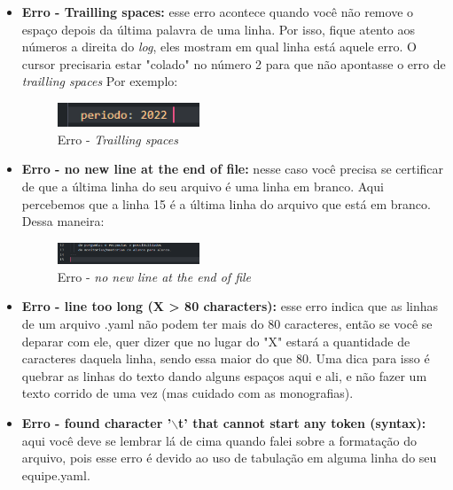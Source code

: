 \begin{itemize}
    \item \textbf{Erro - Trailling spaces:} esse erro acontece quando você não remove o espaço depois da última palavra de uma linha. Por isso, fique atento aos números a direita do \textit{log}, eles mostram em qual linha está aquele erro. O cursor precisaria estar "colado" no número 2 para que não apontasse o erro de \textit{trailling spaces} Por exemplo:
        \begin{figure}[htb]
        \centering
        \caption{Erro - \textit{Trailling spaces}}
        \includegraphics[width=0.4\textwidth]{anexos/Imagens_Blog/erro1.png}
        \end{figure}
        \FloatBarrier
    
    \item \textbf{Erro - no new line at the end of file: } nesse caso você precisa se certificar de que a última linha do seu arquivo é uma linha em branco. Aqui percebemos que a linha 15 é a última linha do arquivo que está em branco. Dessa maneira:
    \begin{figure}[htb]
        \centering
        \caption{Erro - \textit{no new line at the end of file}}
        \includegraphics[width=0.4\textwidth]{anexos/Imagens_Blog/erro2.png}
        \end{figure}
        \FloatBarrier
    
    \item \textbf{Erro - line too long (X > 80 characters):}  esse erro indica que as linhas de um arquivo .yaml não podem ter mais do 80 caracteres, então se você se deparar com ele, quer dizer que no lugar do "X" estará a quantidade de caracteres daquela linha, sendo essa maior do que 80. Uma dica para isso é quebrar as linhas do texto dando alguns espaços aqui e ali, e não fazer um texto corrido de uma vez (mas cuidado com as monografias).
    
    \item \textbf{Erro - found character '$\backslash$t' that cannot start any token (syntax):} aqui você deve se lembrar lá de cima quando falei sobre a formatação do arquivo, pois esse erro é devido ao uso de tabulação em alguma linha do seu equipe.yaml. 
\end{itemize}

